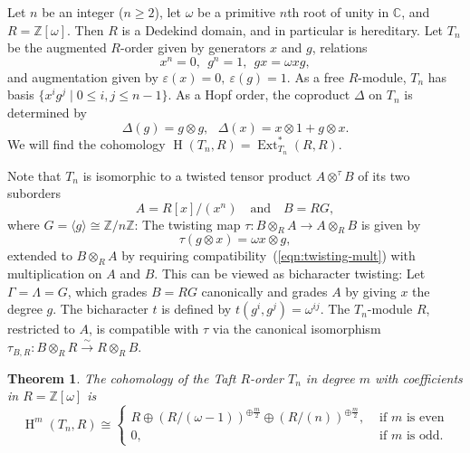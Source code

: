 \documentclass[11pt]{amsart}
\numberwithin{equation}{section}
\newtheorem{theorem}[equation]{Theorem}
\theoremstyle{definition}
\theoremstyle{remark}
\newcommand{\C}{\mathbb{C}}
\newcommand{\Z}{\mathbb{Z}}
\newcommand{\om}{\omega}
\newcommand\Ext{\operatorname{Ext}}
\newcommand\Homol{\operatorname{H}}
\newcommand\coh{\Homol}
\newcommand\ot{\otimes}
\newcommand{\ttp}{A\ot^{\tau}\! B}
\begin{document}
Let $n$ be an integer ($n\geq 2$), 
let $\om$ be a primitive $n$th root of unity in $\C$,
and $R = \Z[\om]$.
Then $R$ is a Dedekind domain, and in particular is hereditary.
Let $T_n$ be the augmented $R$-order given by generators $x$ and $g$,
relations 
\[
   x^n=0, \ \ g^n=1, \ \ gx=\om xg ,
\]
and augmentation given by $\varepsilon(x)=0, \ \varepsilon(g) =1$.
As a free $R$-module, $T_n$ has basis
$\{x^ig^j\mid 0 \leq i,j\leq n-1\}$. 
As a Hopf order, the coproduct $\Delta$ on $T_n$ is determined by
\[
   \Delta(g) = g\ot g , \ \ \ \Delta(x) = x\ot 1 + g\ot x . 
\]
We will find the cohomology
$
   \coh(T_n , R) = \Ext^*_{T_n}(R,R) .
$

Note that $T_n$ is isomorphic to a twisted tensor product
$\ttp$ of its two suborders 
\[
   A = R[x]/(x^n) \ \ \ \mbox{ and } \ \ \  
B = R G,
\]
where $G = \langle g\rangle\cong \Z/n\Z$: 
The twisting map $\tau: B\ot_R A \rightarrow A\ot_R B$ is given by 
\[
  \tau(g\ot x) = \om x\ot g , 
\]
extended to $B\ot_R A$ by requiring compatibility~(\ref{eqn:twisting-mult}) 
with multiplication on $A$ and $B$. 
This can be viewed as bicharacter twisting: 
Let $\Gamma = \Lambda = G$,
which grades $B = RG$ canonically and grades $A$ by 
giving $x$ the degree $g$.
The bicharacter $t$ is defined by
  $
  t(g^i, g^j ) = \omega^{ij} .
  $
The $T_n$-module $R$, restricted to $A$, is
compatible with $\tau$ via the canonical isomorphism
$\tau_{B,R} : B\ot_R R \stackrel{\sim}{\longrightarrow} R\ot_R B$.


\begin{theorem}\label{thm:Taft}
  The cohomology of the Taft $R$-order $T_n$ 
in degree $m$ with coefficients in $R =\Z[\omega]$ is
  \[
  \coh^m(T_n,R) \cong \left\{
  \begin{array}{ll}
    R\oplus  \left( R/(\omega -1) \right)^{\oplus \frac{m}{2}}
    \oplus \left( R/(n) \right)^{\oplus \frac{m}{2}} ,
    & \mbox{ if $m$ is even}\\
    0 , & \mbox{ if $m$ is odd} .
  \end{array}\right.
  \]
\end{theorem}
\end{document}
